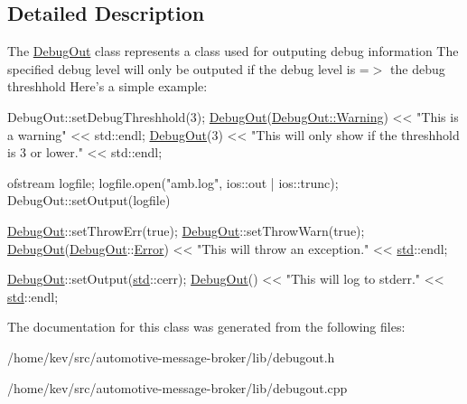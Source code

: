 \subsection{Detailed Description}
The \hyperlink{classDebugOut}{Debug\+Out} class represents a class used for outputing debug information The specified debug level will only be outputed if the debug level is =$>$ the debug threshhold Here's a simple example\+: 


\begin{DoxyCode}
DebugOut::setDebugThreshhold(3);
\hyperlink{classDebugOut}{DebugOut}(\hyperlink{classDebugOut_a7a06aa04dd6cb8c1e9bcd083d30d91ad}{DebugOut::Warning}) << \textcolor{stringliteral}{"This is a warning"} << std::endl;
\hyperlink{classDebugOut}{DebugOut}(3) << \textcolor{stringliteral}{"This will only show if the threshhold is 3 or lower."} << std::endl;

ofstream logfile;
logfile.open(\textcolor{stringliteral}{"amb.log"}, ios::out | ios::trunc);
DebugOut::setOutput(logfile)

\hyperlink{classDebugOut}{DebugOut}::setThrowErr(true);
\hyperlink{classDebugOut}{DebugOut}::setThrowWarn(true);
\hyperlink{classDebugOut}{DebugOut}(\hyperlink{classDebugOut}{DebugOut}::\hyperlink{classDebugOut_a40314aef0df2ed8a705d9372d49b0535}{Error}) << "This will throw an exception." << 
      \hyperlink{namespacestd}{std}::endl;

\hyperlink{classDebugOut}{DebugOut}::setOutput(\hyperlink{namespacestd}{std}::cerr);
\hyperlink{classDebugOut}{DebugOut}() << "This will log to stderr." << \hyperlink{namespacestd}{std}::endl;
\end{DoxyCode}
 

The documentation for this class was generated from the following files\+:\begin{DoxyCompactItemize}
\item 
/home/kev/src/automotive-\/message-\/broker/lib/debugout.\+h\item 
/home/kev/src/automotive-\/message-\/broker/lib/debugout.\+cpp\end{DoxyCompactItemize}
